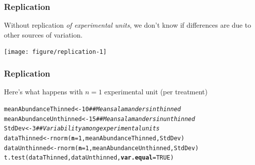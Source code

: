 \documentclass[color=usenames,dvipsnames]{beamer}\usepackage[]{graphicx}\usepackage[]{color}
\makeatletter
\newcommand{\hlnum}[1]{\textcolor[rgb]{0.69,0.494,0}{#1}}%
\newcommand{\hlcom}[1]{\textcolor[rgb]{0.514,0.506,0.514}{\textit{#1}}}%
\newcommand{\hlstd}[1]{\textcolor[rgb]{0,0,0}{#1}}%
\newcommand{\hlkwb}[1]{\textcolor[rgb]{0,0.341,0.682}{#1}}%
\newcommand{\hlkwc}[1]{\textcolor[rgb]{0,0,0}{\textbf{#1}}}%
\newcommand{\hlkwd}[1]{\textcolor[rgb]{0.004,0.004,0.506}{#1}}%
\newenvironment{kframe}{%
 \def\at@end@of@kframe{}%
 \ifinner\ifhmode%
  \def\at@end@of@kframe{\end{minipage}}%
  \begin{minipage}{\columnwidth}%
 \fi\fi%
 \def\FrameCommand##1{\hskip\@totalleftmargin \hskip-\fboxsep
 \colorbox{shadecolor}{##1}\hskip-\fboxsep
     \hskip-\linewidth \hskip-\@totalleftmargin \hskip\columnwidth}%
 \MakeFramed {\advance\hsize-\width
   \@totalleftmargin\z@ \linewidth\hsize
   \@setminipage}}%
 {\par\unskip\endMakeFramed%
 \at@end@of@kframe}
\newenvironment{knitrout}{}{} %
\makeatother
\begin{document}
\begin{frame}[fragile]
  \frametitle{Replication}
  Without replication {\it of experimental units}, we don't know if
  differences are due to other sources of variation. \\
  \vfill
\begin{knitrout}\scriptsize
{}\color{fgcolor}

{\centering \texttt{[image: figure/replication-1]} 

}


\end{knitrout}
\end{frame}




\begin{frame}[fragile]
  \frametitle{Replication}
  Here's what happens with $n=1$ experimental unit (per treatment) \\
\begin{knitrout}\scriptsize
{}\color{fgcolor}\begin{kframe}
\begin{alltt}
\hlstd{meanAbundanceThinned} \hlkwb{<-} \hlnum{10}      \hlcom{## Mean salamanders in thinned}
\hlstd{meanAbundanceUnthinned} \hlkwb{<-} \hlnum{15}    \hlcom{## Mean salamanders in unthinned}
\hlstd{StdDev} \hlkwb{<-} \hlnum{3}                     \hlcom{## Variability among experimental units}
\hlstd{dataThinned} \hlkwb{<-} \hlkwd{rnorm}\hlstd{(}\hlkwc{n}\hlstd{=}\hlnum{1}\hlstd{, meanAbundanceThinned, StdDev)}
\hlstd{dataUnthinned} \hlkwb{<-} \hlkwd{rnorm}\hlstd{(}\hlkwc{n}\hlstd{=}\hlnum{1}\hlstd{, meanAbundanceUnthinned, StdDev)}
\hlkwd{t.test}\hlstd{(dataThinned, dataUnthinned,} \hlkwc{var.equal}\hlstd{=}\hlnum{TRUE}\hlstd{)}
\end{alltt}


{\ttfamily\noindent\bfseries\color{errorcolor}{\#\# Error in t.test.default(dataThinned, dataUnthinned, var.equal = TRUE): not enough observations}}\end{kframe}
\end{knitrout}
\end{frame}
\end{document}
